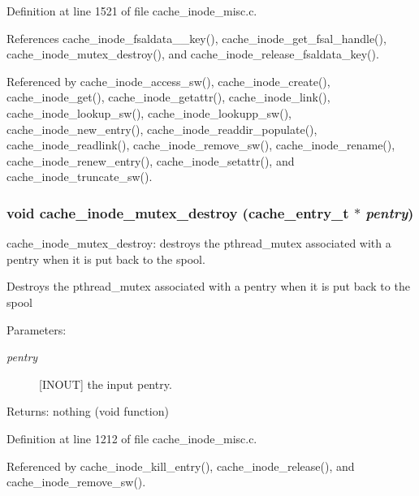 Definition at line 1521 of file cache\_\-inode\_\-misc.c.

References cache\_\-inode\_\-fsaldata\_\_\-key(), cache\_\-inode\_\-get\_\-fsal\_\-handle(), cache\_\-inode\_\-mutex\_\-destroy(), and cache\_\-inode\_\-release\_\-fsaldata\_\-key().

Referenced by cache\_\-inode\_\-access\_\-sw(), cache\_\-inode\_\-create(), cache\_\-inode\_\-get(), cache\_\-inode\_\-getattr(), cache\_\-inode\_\-link(), cache\_\-inode\_\-lookup\_\-sw(), cache\_\-inode\_\-lookupp\_\-sw(), cache\_\-inode\_\-new\_\-entry(), cache\_\-inode\_\-readdir\_\-populate(), cache\_\-inode\_\-readlink(), cache\_\-inode\_\-remove\_\-sw(), cache\_\-inode\_\-rename(), cache\_\-inode\_\-renew\_\-entry(), cache\_\-inode\_\-setattr(), and cache\_\-inode\_\-truncate\_\-sw().
\subsubsection{\setlength{\rightskip}{0pt plus 5cm}void cache\_\-inode\_\-mutex\_\-destroy (cache\_\-entry\_\-t $\ast$ {\em pentry})}\label{cache__inode__misc_8c_a12}


cache\_\-inode\_\-mutex\_\-destroy: destroys the pthread\_\-mutex associated with a pentry when it is put back to the spool.

Destroys the pthread\_\-mutex associated with a pentry when it is put back to the spool

\begin{Desc}
\item[Parameters:]
\begin{description}
\item[{\em pentry}][INOUT] the input pentry.\end{description}
\end{Desc}
\begin{Desc}
\item[Returns:]nothing (void function) \end{Desc}


Definition at line 1212 of file cache\_\-inode\_\-misc.c.

Referenced by cache\_\-inode\_\-kill\_\-entry(), cache\_\-inode\_\-release(), and cache\_\-inode\_\-remove\_\-sw().
